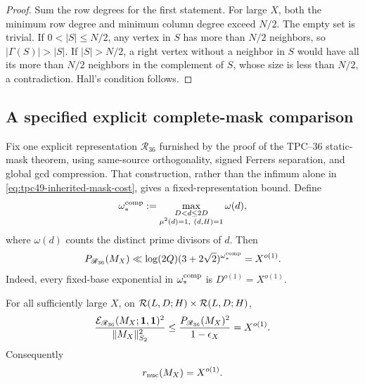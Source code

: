 \begin{proof}
Sum the row degrees for the first statement.  For large \(X\), both the
minimum row degree and minimum column degree exceed \(N/2\).  The empty
set is trivial.  If \(0<|S|\le N/2\), any vertex in \(S\) has more than
\(N/2\) neighbors, so \(|\Gamma(S)|>|S|\).  If \(|S|>N/2\), a right
vertex without a neighbor in \(S\) would have all its more than \(N/2\)
neighbors in the complement of \(S\), whose size is less than \(N/2\),
a contradiction.  Hall's condition follows.
\end{proof}

\subsection{A specified explicit complete-mask comparison}

Fix one explicit representation \(\mathscr R_{36}\) furnished by the
proof of the TPC--36 static-mask theorem, using same-source
orthogonality, signed Ferrers separation, and global gcd compression.
That construction, rather than the infimum alone in
\eqref{eq:tpc49-inherited-mask-cost}, gives a fixed-representation bound.
Define
\begin{equation}
 \omega_*^{\rm comp}
 :=\max_{\substack{D<d\le2D\\ \mu^2(d)=1,\ (d,H)=1}}\omega(d),
 \label{eq:tpc49-complete-omega}
\end{equation}
where \(\omega(d)\) counts the distinct prime divisors of \(d\).  Then
\begin{equation}
 P_{\mathscr R_{36}}(M_X)
 \ll \log(2Q)(3+2\sqrt2)^{\omega_*^{\rm comp}}=X^{o(1)}.
 \label{eq:tpc49-explicit-mask-cost}
\end{equation}
Indeed, every fixed-base exponential in \(\omega_*^{\rm comp}\) is
\(D^{o(1)}=X^{o(1)}\).

\begin{theorem}
\label{thm:tpc49-static-soft}
For all sufficiently large \(X\), on
\(\mathcal R(L,D;H)\times\mathcal R(L,D;H)\),
\begin{equation}
 \frac{\mathcal E_{\mathscr R_{36}}(M_X;\mathbf 1,\mathbf 1)^2}
 {\|M_X\|_{S_2}^2}
 \le
 \frac{P_{\mathscr R_{36}}(M_X)^2}
 {1-\epsilon_X}
 =X^{o(1)}.
 \label{eq:tpc49-static-canonical-soft}
\end{equation}
Consequently
\begin{equation}
 r_{\rm nuc}(M_X)=X^{o(1)}.
 \label{eq:tpc49-static-intrinsic-soft}
\end{equation}
\end{theorem}

